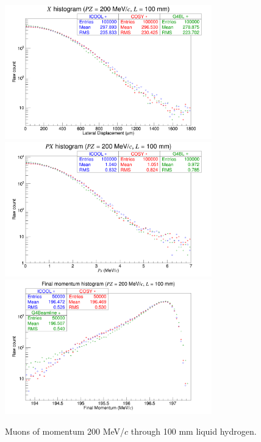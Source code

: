 \begin{figure}[!htb]
  \centering
    \includegraphics[width=0.8\textwidth]{Validation/LH/X.200.100.png} 
    \includegraphics[width=0.8\textwidth]{Validation/LH/PX.200.100.png} 
    \includegraphics[width=0.8\textwidth]{Validation/LH/strag.200.100.png} 
  \caption{Muons of momentum 200 MeV/$c$ through 100 mm liquid hydrogen.}
  \label{fig:200.100}
\end{figure}

